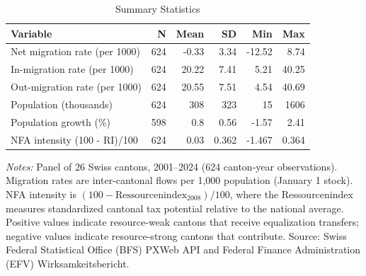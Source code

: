 \begin{table}[H]
\centering
\caption{Summary Statistics}
\begin{threeparttable}
\begin{tabular}{lrrrrr}
\toprule
Variable & N & Mean & SD & Min & Max \\
\midrule
Net migration rate (per 1000) & 624 & -0.33 & 3.34 & -12.52 & 8.74 \\
In-migration rate (per 1000) & 624 & 20.22 & 7.41 & 5.21 & 40.25 \\
Out-migration rate (per 1000) & 624 & 20.55 & 7.51 & 4.54 & 40.69 \\
Population (thousands) & 624 & 308 & 323 & 15 & 1606 \\
Population growth (\%) & 598 & 0.8 & 0.56 & -1.57 & 2.41 \\
NFA intensity (100 - RI)/100 & 624 & 0.03 & 0.362 & -1.467 & 0.364 \\
\bottomrule
\end{tabular}
\begin{tablenotes}[flushleft]
\small
\item \textit{Notes:} Panel of 26 Swiss cantons, 2001--2024 (624 canton-year observations). Migration rates are inter-cantonal flows per 1,000 population (January 1 stock). NFA intensity is $(100 - \text{Ressourcenindex}_{2008})/100$, where the Ressourcenindex measures standardized cantonal tax potential relative to the national average. Positive values indicate resource-weak cantons that receive equalization transfers; negative values indicate resource-strong cantons that contribute. Source: Swiss Federal Statistical Office (BFS) PXWeb API and Federal Finance Administration (EFV) Wirksamkeitsbericht.
\end{tablenotes}
\end{threeparttable}
\label{tab:summary}
\end{table}

